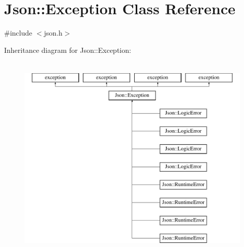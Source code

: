 \section{Json\+:\+:Exception Class Reference}
\label{class_json_1_1_exception}


{\ttfamily \#include $<$json.\+h$>$}

Inheritance diagram for Json\+:\+:Exception\+:\begin{figure}[H]
\begin{center}
\leavevmode
\includegraphics[height=10.000000cm]{class_json_1_1_exception}
\end{center}
\end{figure}
